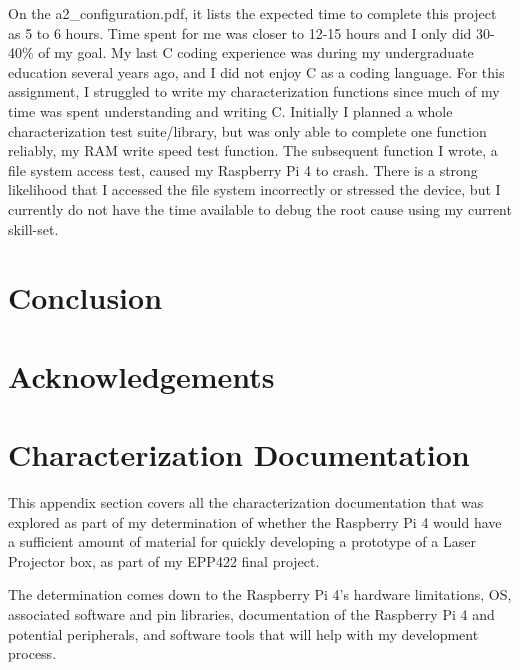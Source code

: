\documentclass[journal]{IEEEtran}
\begin{document}
    On the a2\_configuration.pdf, it lists the expected time to complete this project as 5 to 6 hours.
    Time spent for me was closer to 12-15 hours and I only did 30-40\% of my goal.
    My last C coding experience was during my undergraduate education several years ago, and I did not enjoy C as a coding language.
    For this assignment, I struggled to write my characterization functions since much of my time was spent understanding and writing C.
    Initially I planned a whole characterization test suite/library, but was only able to complete one function reliably, my RAM write speed test function.
    The subsequent function I wrote, a file system access test, caused my Raspberry Pi 4 to crash.
    There is a strong likelihood that I accessed the file system incorrectly or stressed the device, but I currently do not have the time available to debug the root cause using my current skill-set.  


    \section{Conclusion}


    \nocite{*}
    \newpage

    
    

    \newpage
    \section{Acknowledgements}

    \appendices
    \section{Characterization Documentation}
    This appendix section covers all the characterization documentation that was explored as part of my determination of whether the Raspberry Pi 4 would have a sufficient amount of material for quickly developing a prototype of a
    Laser Projector box, as part of my EPP422 final project.
    
    The determination comes down to the Raspberry Pi 4's hardware limitations, OS, associated software and pin libraries, documentation of the Raspberry Pi 4 and potential peripherals, and software tools that 
    will help with my development process.
\end{document}
